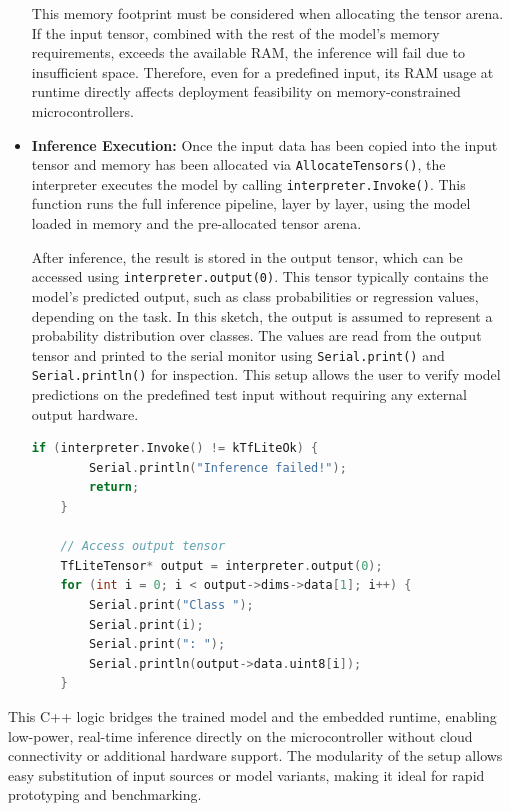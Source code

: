 \begin{itemize}
    This memory footprint must be considered when allocating the tensor arena. If the input tensor, combined with the rest of the model’s memory requirements, exceeds the available RAM, the inference will fail due to insufficient space. Therefore, even for a predefined input, its RAM usage at runtime directly affects deployment feasibility on memory-constrained microcontrollers.


    \item \textbf{Inference Execution:} 
    Once the input data has been copied into the input tensor and memory has been allocated via \texttt{AllocateTensors()}, the interpreter executes the model by calling \texttt{interpreter.Invoke()}. This function runs the full inference pipeline, layer by layer, using the model loaded in memory and the pre-allocated tensor arena.
    
    After inference, the result is stored in the output tensor, which can be accessed using \texttt{interpreter.output(0)}. This tensor typically contains the model’s predicted output, such as class probabilities or regression values, depending on the task. In this sketch, the output is assumed to represent a probability distribution over classes. The values are read from the output tensor and printed to the serial monitor using \texttt{Serial.print()} and \texttt{Serial.println()} for inspection. This setup allows the user to verify model predictions on the predefined test input without requiring any external output hardware.
    
    \clearpage
    
    \begin{lstlisting}[language=C, caption={Running inference and printing the result to the serial monitor}, label=lst:run_inference_print_output]
    if (interpreter.Invoke() != kTfLiteOk) {
        Serial.println("Inference failed!");
        return;
    }
    
    // Access output tensor
    TfLiteTensor* output = interpreter.output(0);
    for (int i = 0; i < output->dims->data[1]; i++) {
        Serial.print("Class ");
        Serial.print(i);
        Serial.print(": ");
        Serial.println(output->data.uint8[i]);
    }
    \end{lstlisting}

    
\end{itemize}

This C++ logic bridges the trained model and the embedded runtime, enabling low-power, real-time inference directly on the microcontroller without cloud connectivity or additional hardware support. The modularity of the setup allows easy substitution of input sources or model variants, making it ideal for rapid prototyping and benchmarking.

